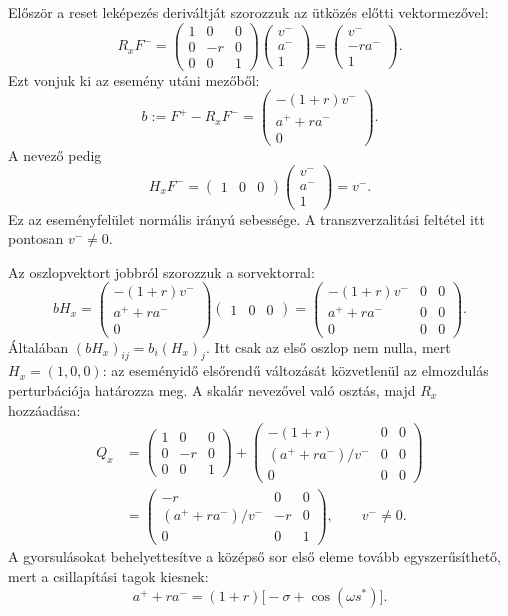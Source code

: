 Először a reset leképezés deriváltját szorozzuk az ütközés előtti vektormezővel:
\[
R_xF^-=\begin{pmatrix}1&0&0\\0&-r&0\\0&0&1\end{pmatrix}
\begin{pmatrix}v^-\\a^-\\1\end{pmatrix}
=\begin{pmatrix}v^-\\-ra^-\\1\end{pmatrix}.
\]
Ezt vonjuk ki az esemény utáni mezőből:
\[
b:=F^+-R_xF^-=\begin{pmatrix}-(1+r)v^-\\a^++ra^-\\0\end{pmatrix}.
\]
A nevező pedig
\[
H_xF^-=\begin{pmatrix}1&0&0\end{pmatrix}
\begin{pmatrix}v^-\\a^-\\1\end{pmatrix}=v^-.
\]
Ez az eseményfelület normális irányú sebessége. A transzverzalitási feltétel itt pontosan $v^-\neq0$.


Az oszlopvektort jobbról szorozzuk a sorvektorral:
\[
bH_x=
\begin{pmatrix}-(1+r)v^-\\a^++ra^-\\0\end{pmatrix}
\begin{pmatrix}1&0&0\end{pmatrix}
=\begin{pmatrix}
-(1+r)v^-&0&0\\a^++ra^-&0&0\\0&0&0
\end{pmatrix}.
\]
Általában $(bH_x)_{ij}=b_i(H_x)_j$. Itt csak az első oszlop nem nulla, mert $H_x=(1,0,0)$: az eseményidő elsőrendű változását közvetlenül az elmozdulás perturbációja határozza meg.
A skalár nevezővel való osztás, majd $R_x$ hozzáadása:
\[
\begin{aligned}
Q_x&=\begin{pmatrix}1&0&0\\0&-r&0\\0&0&1\end{pmatrix}
+\begin{pmatrix}-(1+r)&0&0\\(a^++ra^-)/v^-&0&0\\0&0&0\end{pmatrix}\\[2mm]
&=\begin{pmatrix}-r&0&0\\(a^++ra^-)/v^-&-r&0\\0&0&1\end{pmatrix},\qquad v^-\neq0.
\end{aligned}
\]
A gyorsulásokat behelyettesítve a középső sor első eleme tovább egyszerűsíthető, mert a csillapítási tagok kiesnek:
\[
a^++ra^-=(1+r)\bigl[-\sigma+\cos(\omega s^*)\bigr].
\]


